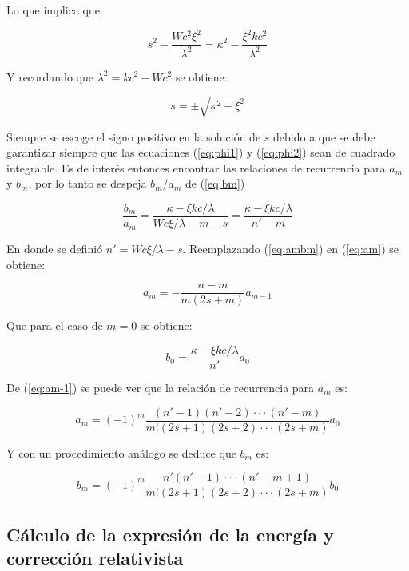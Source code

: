 \documentclass[a4paper, 12pt]{article} %
\begin{document}
Lo que implica que:

\[
s^2 - \dfrac{Wc^2 \xi^2}{\lambda^2} = \kappa^2 - \dfrac{\xi^2 kc^2}{\lambda^2}
\]

Y recordando que $\lambda^2 = kc^2 + Wc^2$ se obtiene:

\[
s = \pm \sqrt{\kappa^2 - \xi^2}
\]

Siempre se escoge el signo positivo en la soluci\'on de $s$ debido a que se debe garantizar siempre
que las ecuaciones (\ref{eq:phi1})  y (\ref{eq:phi2}) sean de cuadrado integrable. Es de inter\'es entonces
encontrar las relaciones de recurrencia para $a_m$ y $b_m$, por lo tanto se despeja $b_m/a_m$ de (\ref{eq:bm})

\begin{equation}\label{eq:ambm}
\dfrac{b_m}{a_m} = \dfrac{\kappa - \xi kc/\lambda}{Wc\xi /\lambda - m - s} = \dfrac{\kappa - \xi kc/\lambda}{n'-m}
\end{equation} 

En donde se defini\'o $n' = Wc \xi /\lambda - s$. Reemplazando (\ref{eq:ambm}) en (\ref{eq:am}) se obtiene:

\begin{equation}\label{eq:am-1}
a_m = - \dfrac{n-m}{m(2s+m)}a_{m-1}
\end{equation} 

Que para el caso de $m=0$ se obtiene:

\begin{equation}
b_0 = \dfrac{\kappa - \xi kc/\lambda}{n'}a_0
\end{equation}

De (\ref{eq:am-1}) se puede ver que la relaci\'on de recurrencia para $a_m$ es:

\begin{equation}
a_m = (-1)^m \dfrac{(n'-1)(n'-2)\cdot\cdot\cdot(n'-m)}{m!(2s+1)(2s+2)\cdot\cdot\cdot(2s+m)}a_0
\end{equation} 

Y con un procedimiento an\'alogo se deduce que $b_m$ es:
 
\begin{equation}
b_m = (-1)^m \dfrac{n'(n'-1)\cdot\cdot\cdot (n'-m +1)}{m!(2s+1)(2s+2)\cdot\cdot\cdot(2s+m)}b_0
\end{equation}

\subsection{C\'alculo de la expresi\'on de la energ\'ia y correcci\'on relativista}
\end{document}
